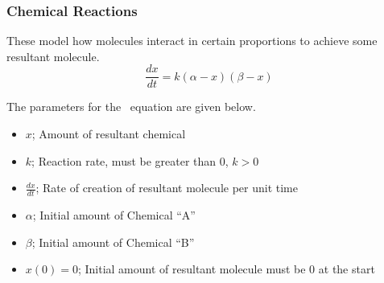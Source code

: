                         \subsubsection{Chemical Reactions} \label{subsubsec:Chemical Reactions}
                        \begin{definition} \label{def:Chemical Reactions}
                          These model how molecules interact in certain proportions to achieve some resultant molecule.
                          \begin{equation} \label{eq:Chemical Reactions}
                            \frac{dx}{dt} = k \left( \alpha - x \right) \left( \beta - x \right)
                          \end{equation}
                          \begin{remark}
                            The parameters for the ~equation are given below.
                            \begin{itemize}[noitemsep, nolistsep]
                            \item $x$; Amount of resultant chemical
                            \item $k$; Reaction rate, must be greater than 0, $k > 0$
                            \item $\frac{dx}{dt}$; Rate of creation of resultant molecule per unit time
                            \item $\alpha$; Initial amount of Chemical ``A''
                            \item $\beta$; Initial amount of Chemical ``B''
                            \item $x \left( 0 \right) = 0$; Initial amount of resultant molecule must be 0 at the start
                            \end{itemize}
                          \end{remark}
                        \end{definition}
                                                          
